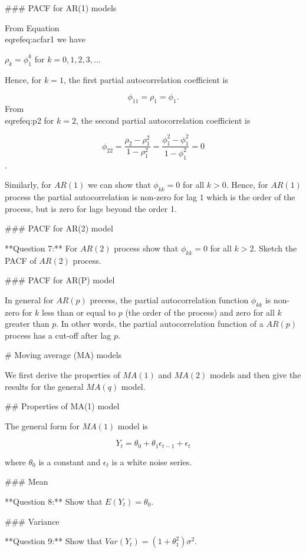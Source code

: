 \documentclass[11pt,a4paper,]{article}
\begin{document}
{### PACF for AR(1) models

From Equation \\eqref{eq:acfar1} we have 

$\rho_k=\phi_1^k$ for $k=0, 1, 2, 3,...$

Hence, for $k=1$, the first partial autocorrelation coefficient is

$$\phi_{11}=\rho_1=\phi_1.$$
From \\eqref{eq:p2}  for $k=2$, the second partial autocorrelation coefficient is

$$\phi_{22}=\frac{\rho_2-\rho_1^2}{1-\rho_1^2}=\frac{\phi_1^2-\phi_1^2}{1-\phi_1^2} = 0$$.

Similarly, for $AR(1)$ we can show that $\phi_{kk}=0$ for all $k > 0$. Hence, for $AR(1)$ process the partial autocorrelation is non-zero for lag $1$ which is the order of the process, but is zero for lags beyond the order 1. 

### PACF for AR(2) model

**Question 7:** For $AR(2)$ process show that $\phi_{kk}=0$ for all $k>2$. Sketch the PACF of $AR(2)$ process.

### PACF for AR(P) model

In general for $AR(p)$ precess, the partial autocorrelation function $\phi_{kk}$ is non-zero for $k$ less than or equal to $p$ (the order of the process) and zero for all $k$ greater than $p$. In other words, the partial autocorrelation function of a $AR(p)$ process has a cut-off after lag $p$. 



# Moving average (MA) models


We first derive the properties of $MA(1)$ and $MA(2)$ models and then give the results for the general $MA(q)$ model. 

## Properties of MA(1) model

The general form for $MA(1)$ model is

\begin{equation}
  \label{eq:ma1}
Y_t = \theta_0 + \theta_1 \epsilon_{t-1} + \epsilon_t
\end{equation}

where $\theta_0$ is a constant and ${\epsilon_t}$ is a white noise series.

### Mean

**Question 8:** Show that $E(Y_t) = \theta_0$. 

### Variance

**Question 9:** Show that $Var(Y_t) = (1+\theta_1^2)\sigma^2$.

}
\end{document}

